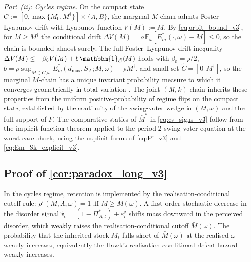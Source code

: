 \documentclass[11pt,twoside]{extarticle}
\begin{document}
\emph{Part~(ii): Cycles regime.} On the compact state $C:=[0,\max\{M_0,M^\dagger\}]\times\{A,B\}$, the marginal $M$-chain admits Foster--Lyapunov drift with Lyapunov function $V(M):=M$. By \eqref{eq:orbit_bound_v3}, for $M\ge M^\dagger$ the conditional drift $\Delta V(M)=\rho\,\mathbb E_\omega[E_m^*(\cdot,\omega)-M]\le 0$, so the chain is bounded almost surely. The full Foster--Lyapunov drift inequality $\Delta V(M)\le-\beta_0 V(M)+b\,\mathbbm{1}_{\tilde C}(M)$ holds with $\beta_0=\rho/2$, $b=\rho\sup_{M\in\tilde C,\omega}E_m^*(d_{\max},S_A;M,\omega)+\rho M^\dagger$, and small set $\tilde C=[0,M^\dagger]$, so the marginal $M$-chain has a unique invariant probability measure to which it converges geometrically in total variation \citep[Ch.~14--15]{meynMarkovChainsStochastic2012}. The joint $(M,k)$-chain inherits these properties from the uniform positive-probability of regime flips on the compact state, established by the continuity of the swing-voter wedge in $(M,\omega)$ and the full support of $F$. The comparative statics of $\bar M^*$ in \eqref{eq:cs_signs_v3} follow from the implicit-function theorem applied to the period-2 swing-voter equation at the worst-case shock, using the explicit forms of \eqref{eq:Pi_v3} and \eqref{eq:Em_Sk_explicit_v3}.

\subsection*{Proof of \autoref{cor:paradox_long_v3}} \label{oa:proof_paradox_long_v3}

In the cycles regime, retention is implemented by the realisation-conditional cutoff rule: $\rho^v(M,A,\omega)=1$ iff $M\ge\bar M(\omega)$. A first-order stochastic decrease in the disorder signal $\tilde v_t=(1-\Pi_{A,t}^*)+\varepsilon_t^v$ shifts mass downward in the perceived disorder, which weakly raises the realisation-conditional cutoff $\bar M(\omega)$. The probability that the inherited stock $M_t$ falls short of $\bar M(\omega)$ at the realised $\omega$ weakly increases, equivalently the Hawk's realisation-conditional defeat hazard weakly increases.

\end{document}
